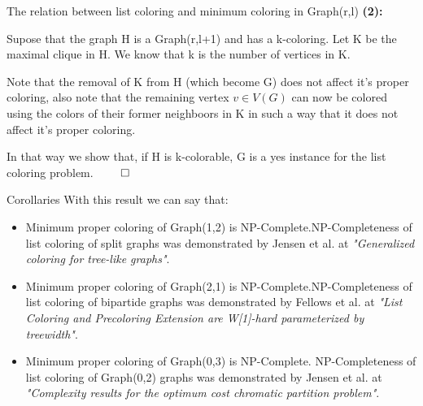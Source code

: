 \documentclass[9pt, compress]{beamer}
\begin{document}
    \begin{frame}{The relation between list coloring and minimum coloring in Graph(r,l)}
      \textbf{(2):}
      
      Supose that the graph H is a Graph(r,l+1) and has a k-coloring. Let K be the maximal clique in H.
      We know that k is the number of vertices in K.
      
      Note that the removal of K from H (which become G) does not affect it's proper coloring, also note that the remaining vertex $v \in V(G)$ can now be colored using the colors of their former neighboors in K in such a way that it does not affect it's proper coloring.
      
      In that way we show that, if H is k-colorable, G is a yes instance for the list coloring problem.
      $\qed$
    \end{frame}
    \begin{frame}{Corollaries}
      With this result we can say that:
      \begin{itemize}
        \item Minimum proper coloring of Graph(1,2) is NP-Complete.\newline NP-Completeness of list coloring of split graphs was demonstrated by Jensen et al. at \textit{"Generalized coloring for tree-like graphs"}.
        \item Minimum proper coloring of Graph(2,1) is NP-Complete.\newline NP-Completeness of list coloring of bipartide graphs was demonstrated by Fellows et al. at \textit{"List Coloring and Precoloring Extension are W[1]-hard parameterized by treewidth"}.
        \item Minimum proper coloring of Graph(0,3) is NP-Complete.
        \newline NP-Completeness of list coloring of Graph(0,2) graphs was demonstrated by Jensen et al. at \textit{"Complexity results for the optimum cost chromatic partition problem"}.
      \end{itemize}
    \end{frame}
\end{document}
